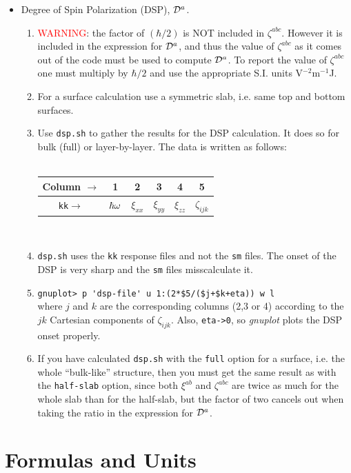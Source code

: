 \documentclass[openany,oneside]{book}
\numberwithin{equation}{section}
\begin{document}
\begin{itemize}
\item Degree of Spin Polarization (DSP), ${\mathbf{\cal D}}^a$.
\begin{enumerate}
\item \textcolor{red}{WARNING}: the factor of $(\hbar/2)$ is NOT
  included in $\zeta^{abc}$. However it is included in the expression
  for ${\mathbf{\cal D}}^a$, and thus the value of $\zeta^{abc}$ as it comes out
  of the code must be used to compute ${\mathbf{\cal D}}^a$. To report the value
  of $\zeta^{abc}$ one must multiply by $\hbar/2$ and use the
  appropriate S.I. units V$^{-2}$m$^{-1}$J.
\item For a surface calculation use a symmetric slab, i.e. same top
  and bottom surfaces.
\item Use \verb=dsp.sh= to gather the results for the DSP calculation. It
  does so for bulk (full) or layer-by-layer. The data is written as
follows:\\\\
\begin{tabular}{|c|c|c|c|c|c|}\hline
Column $\to$  & 1 & 2 & 3 & 4 &5 \\\hline
\verb=kk=$\to$  & $\hbar\omega$  & $\xi_{xx}$  &
$\xi_{yy}$ &$\xi_{zz}$ & $\zeta_{ijk}$ \\ \hline
\end{tabular}\\
\item \verb=dsp.sh= uses the \verb=kk= response files and not the \verb=sm=
files. The onset of the DSP is very sharp and the \verb=sm= files
misscalculate it.
\item\verb=gnuplot> p 'dsp-file' u 1:(2*$5/($j+$k+eta)) w l=\\
where $j$ and $k$ are the corresponding columns (2,3 or 4) according to the $jk$
Cartesian components of $\zeta_{ijk}$. Also,
\verb=eta->0=, so {\it gnuplot} plots the DSP onset properly.
\item If you have calculated \verb=dsp.sh= with the \verb=full= option
  for a surface, i.e. the whole ``bulk-like''
 structure,
 then you must get the same result as with the
  \verb=half-slab= option, since both $\xi^{ab}$ and $\zeta^{abc}$ are
  twice as much for the whole slab than for the half-slab, but the
  factor of two cancels out when taking the ratio in the expression for ${\mathbf{\cal D}}^a$.
\end{enumerate}

\end{itemize}

\section{Formulas and Units}
\end{document}

